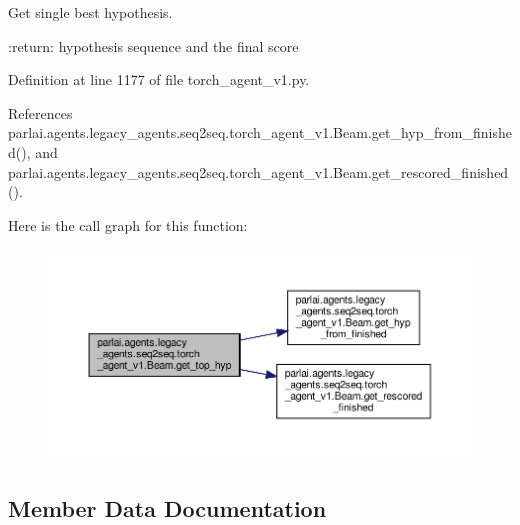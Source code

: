\begin{DoxyVerb}Get single best hypothesis.

:return: hypothesis sequence and the final score
\end{DoxyVerb}
 

Definition at line 1177 of file torch\+\_\+agent\+\_\+v1.\+py.



References parlai.\+agents.\+legacy\+\_\+agents.\+seq2seq.\+torch\+\_\+agent\+\_\+v1.\+Beam.\+get\+\_\+hyp\+\_\+from\+\_\+finished(), and parlai.\+agents.\+legacy\+\_\+agents.\+seq2seq.\+torch\+\_\+agent\+\_\+v1.\+Beam.\+get\+\_\+rescored\+\_\+finished().

Here is the call graph for this function\+:
\nopagebreak
\begin{figure}[H]
\begin{center}
\leavevmode
\includegraphics[width=350pt]{classparlai_1_1agents_1_1legacy__agents_1_1seq2seq_1_1torch__agent__v1_1_1Beam_abd7ea96a6f890297fc526e31e143a018_cgraph}
\end{center}
\end{figure}


\subsection{Member Data Documentation}
\mbox{\label{classparlai_1_1agents_1_1legacy__agents_1_1seq2seq_1_1torch__agent__v1_1_1Beam_a2be10cea5a3cbf664ec9a9a9d283e7a9}} 
